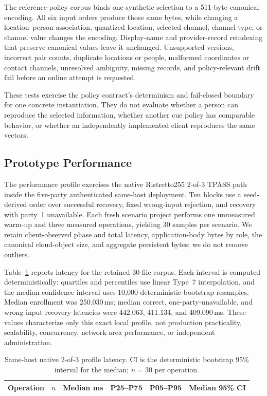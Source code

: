 \documentclass[sigconf,anonymous]{acmart}
\begin{document}
The reference-policy corpus binds one synthetic selection to a 511-byte canonical encoding. All six input orders produce those same bytes, while changing a location--person association, quantized location, selected channel, channel type, or channel value changes the encoding. Display-name and provider-record reindexing that preserve canonical values leave it unchanged. Unsupported versions, incorrect pair counts, duplicate locations or people, malformed coordinates or contact channels, unresolved ambiguity, missing records, and policy-relevant drift fail before an online attempt is requested.

These tests exercise the policy contract's determinism and fail-closed boundary for one concrete instantiation. They do not evaluate whether a person can reproduce the selected information, whether another cue policy has comparable behavior, or whether an independently implemented client reproduces the same vectors.

\subsection{Prototype Performance}

The performance profile exercises the native Ristretto255 2-of-3 TPASS path inside the five-party authenticated same-host deployment. Ten blocks use a seed-derived order over successful recovery, fixed wrong-input rejection, and recovery with party~1 unavailable. Each fresh scenario project performs one unmeasured warm-up and three measured operations, yielding 30 samples per scenario. We retain client-observed phase and total latency, application-body bytes by role, the canonical cloud-object size, and aggregate persistent bytes; we do not remove outliers.

Table~\ref{tab:prototype-benchmarks} reports latency for the retained 30-file corpus. Each interval is computed deterministically: quartiles and percentiles use linear Type~7 interpolation, and the median confidence interval uses 10,000 deterministic bootstrap resamples. Median enrollment was 250.030\,ms; median correct, one-party-unavailable, and wrong-input recovery latencies were 442.063, 411.134, and 409.090\,ms. These values characterize only this exact local profile, not production practicality, scalability, concurrency, network-area performance, or independent administration.

\begin{table}[t]
\centering
\caption{Same-host native 2-of-3 profile latency. CI is the deterministic bootstrap 95\% interval for the median; \(n=30\) per operation.}
\label{tab:prototype-benchmarks}
\footnotesize
\begin{tabular}{lrrrrr}
\toprule
\textbf{Operation} & \textbf{\(n\)} & \textbf{Median ms} & \textbf{P25--P75} & \textbf{P05--P95} & \textbf{Median 95\% CI} \\
\midrule

\end{tabular}
\end{table}
\end{document}
